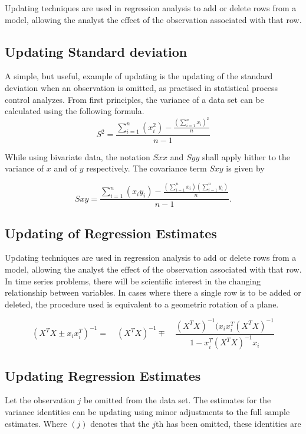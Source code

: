 \documentclass[a4paper,12pt]{article}
\begin{document}
Updating techniques are used in regression analysis to add or delete rows from a model, allowing the analyst the effect of the observation associated with that row.


\subsection{Updating Standard deviation}
A simple, but useful, example of updating is the updating of the standard deviation when an observation is omitted, as practised in statistical process control analyzes. From first principles, the variance of a data set can be calculated using the following formula.
\begin{equation}
S^{2}=\frac{\sum_{i=1}^{n}(x_{i}^{2})-\frac{(\sum_{i=1}^{n}x_{i})^{2}}{n}}{n-1}
\end{equation}


While using bivariate data, the notation $Sxx$ and $Syy$ shall apply hither to the variance of $x$ and of $y$ respectively. The covariance term $Sxy$ is given by


\begin{equation}
Sxy=\frac{\sum_{i=1}^{n}(x_{i}y_{i})-\frac{(\sum_{i=1}^{n}x_{i})(\sum_{i=1}^{n}y_{i})}{n}}{n-1}.
\end{equation}


\subsection{Updating of Regression Estimates}
Updating techniques are used in regression analysis to add or
delete rows from a model, allowing the analyst the effect of the
observation associated with that row. In time series problems,
there will be scientific interest in the changing relationship
between variables. In cases where there a single row is to be
added or deleted, the procedure used is equivalent to a geometric
rotation of a plane.

%
%

\begin{equation}
(X^{T}X \pm x_{i}x_{i}^{T})^{-1} = \quad(X^{T}X )^{-1} \mp \quad
\frac{(X^{T}X)^{-1}(x_{i}x_{i}^{T}(X^{T}X)^{-1}}{1-x_{i}^{T}(X^{T}X)^{-1}x_{i}}
\end{equation}


\subsection{Updating Regression Estimates}
Let the observation $j$ be omitted from the data set. The estimates for the variance identities can be updating using minor adjustments to the full sample estimates. Where $(j)$ denotes that the $j$th has been omitted, these identities are
\end{document}
